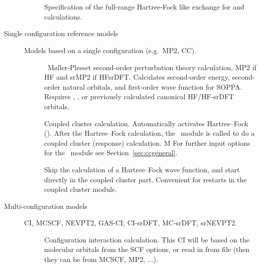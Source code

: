 \begin{description}
\begin{description}
\item[] \ \\
   \\
  Specification of the full-range Hartree-Fock like exchange for  and  calculations.

\end{description}

\item[{\color{blue} Single configuration reference models}] Models based on a single configuration (e.g.\ MP2, CC).

\begin{description}

\item[]
 \
  M{\o}ller-Plesset second-order perturbation theory calculation,
  MP2 if HF and srMP2 if HFsrDFT.
  Calculates second-order energy, second-order natural orbitals,
  and first-order wave function for SOPPA.
  Requires , ,
  or previously calculated canonical HF/HF-srDFT orbitals.

\item[]
  Coupled cluster calculation. Automatically activates Hartree--Fock ().
  After the Hartree--Fock calculation,
  the \cc\ module is called to do a coupled cluster (response) calculation.
  M
  For further input options for the \cc\ module see Section~\ref{sec:ccgeneral}. 

\item[] Skip the calculation of a Hartree--Fock wave
  function, and start directly in the coupled cluster part. Convenient
  for restarts in the coupled cluster module.

\end{description}

\item[{\color{blue} Multi-configuration models}] CI, MCSCF, NEVPT2, GAS-CI; CI-srDFT, MC-srDFT, srNEVPT2.

\begin{description}

\item[]
  Configuration interaction calculation. This CI will be based on the molecular orbitals from the SCF options, or
  read in from file (then they can be from MCSCF, MP2, ...).


\end{description}
\end{description}
